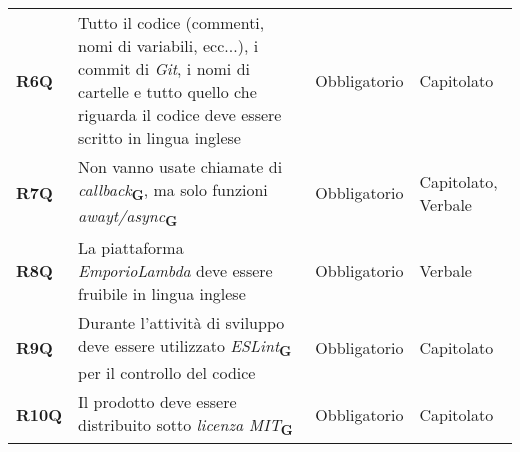 \begin{center}
\begin{longtable}[!h]{p{50px} p{200px} p{100px} p{50px}}
        \textbf{R6Q}                          & Tutto il codice (commenti, nomi di variabili, ecc...), i commit di \textit{Git}, i nomi di cartelle e tutto quello che riguarda il codice deve essere scritto in lingua inglese & Obbligatorio             & Capitolato          \\
        \textbf{R7Q}                          & Non vanno usate chiamate di \textit{callback}\textsubscript{\textbf{G}}, ma solo funzioni \textit{awayt/async}\textsubscript{\textbf{G}}                                        & Obbligatorio             & Capitolato, Verbale \\
        \textbf{R8Q}                          & La piattaforma \textit{EmporioLambda} deve essere fruibile in lingua inglese                                                                                                    & Obbligatorio             & Verbale             \\
        \textbf{R9Q}                          & Durante l'attività di sviluppo deve essere utilizzato \textit{ESLint}\textsubscript{\textbf{G}} per il controllo del codice                                                     & Obbligatorio             & Capitolato          \\
        \textbf{R10Q}                         & Il prodotto deve essere distribuito sotto \textit{licenza MIT}\textsubscript{\textbf{G}}                                                                                        & Obbligatorio             & Capitolato          \\
    \end{longtable}
\end{center}

\newpage
